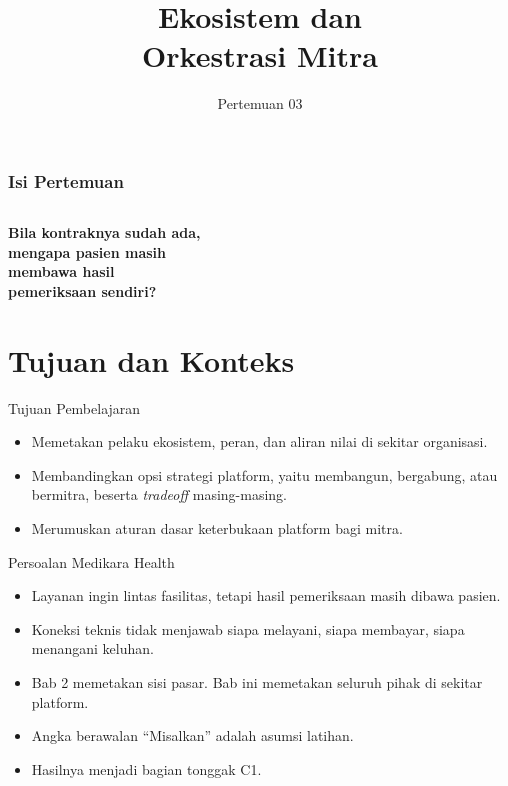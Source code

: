 \documentclass[aspectratio=169, table, 12pt]{beamer}
\title{\Huge Ekosistem dan\\ \vspace{10pt} Orkestrasi Mitra}
\date{Pertemuan 03}
\begin{document}
\frame{\titlepage}

\begin{frame}
  \frametitle{Isi Pertemuan}
  \vspace{14pt}
  \begin{columns}[t]
    {\small\tableofcontents[sections={1-3}]}

    {\small\tableofcontents[sections={4-7}]}
  \end{columns}
\end{frame}

\begin{frame}{\hfill}
  \centering
  \Huge{\textbf{Bila kontraknya sudah ada,\\mengapa pasien masih\\membawa hasil\\pemeriksaan sendiri?}}
\end{frame}

\section{Tujuan dan Konteks}

\begin{frame}{{\Large Tujuan Pembelajaran}}
  \vspace{10pt}
  \begin{itemize}
    \item Memetakan pelaku ekosistem, peran, dan aliran nilai di sekitar organisasi.
    \item Membandingkan opsi strategi platform, yaitu membangun, bergabung, atau bermitra, beserta
          \textit{tradeoff} masing-masing.
    \item Merumuskan aturan dasar keterbukaan platform bagi mitra.
  \end{itemize}
\end{frame}

\begin{frame}{{\Large Persoalan Medikara Health}}
  \vspace{10pt}
  \begin{itemize}
    \item Layanan ingin lintas fasilitas, tetapi hasil pemeriksaan masih dibawa pasien.
    \item Koneksi teknis tidak menjawab siapa melayani, siapa membayar, siapa menangani keluhan.
    \item Bab 2 memetakan sisi pasar. Bab ini memetakan seluruh pihak di sekitar platform.
    \item Angka berawalan ``Misalkan'' adalah asumsi latihan.
    \item Hasilnya menjadi bagian tonggak C1.
  \end{itemize}
\end{frame}
\end{document}
